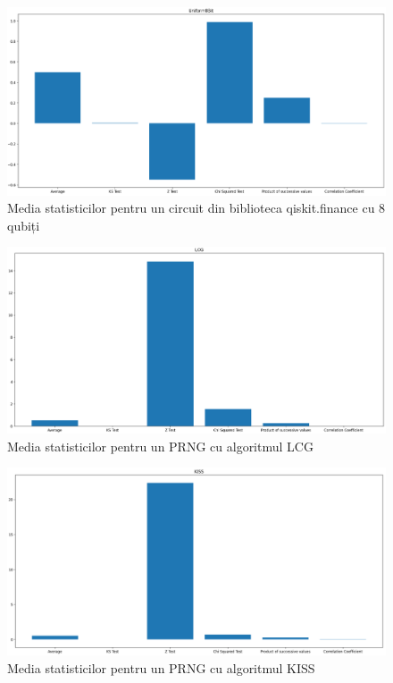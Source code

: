 \begin{figure}[H]
    \centering
    \includegraphics[width=1.0\textwidth]{continut/capitol4/figuri/StatsUniform8Bit.png}
    \caption{Media statisticilor pentru un circuit din biblioteca qiskit.finance cu 8 qubiți}
    \label{fig:StatsBarUniform8Bit}
\end{figure}

\begin{figure}[H]
    \centering
    \includegraphics[width=1.0\textwidth]{continut/capitol4/figuri/StatsLCG.png}
    \caption{Media statisticilor pentru un PRNG cu algoritmul LCG}
    \label{fig:StatsBarLCG}
\end{figure}

\begin{figure}[H]
    \centering
    \includegraphics[width=1.0\textwidth]{continut/capitol4/figuri/StatsKISS.png}
    \caption{Media statisticilor pentru un PRNG cu algoritmul KISS}
    \label{fig:StatsBarKISS}
\end{figure}

